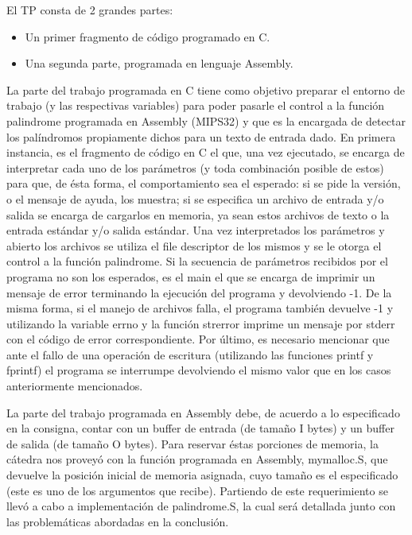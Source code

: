 \documentclass[a4paper,10pt]{article}
\begin{document}
{ \setlength{\parindent}{12pt}

El TP consta de 2 grandes partes:
\begin{itemize}
\item Un primer fragmento de código programado en C.
\item Una segunda parte, programada en lenguaje Assembly.
\end{itemize}

La parte del trabajo programada en C tiene como objetivo preparar el entorno de trabajo (y las respectivas variables) para poder pasarle el control a la función palindrome programada en Assembly (MIPS32) y que es la encargada de detectar los palíndromos propiamente dichos para un texto de entrada dado. En primera instancia, es el fragmento de código en C el que, una vez ejecutado, se encarga de interpretar cada uno de los parámetros (y toda combinación posible de estos) para que, de ésta forma, el comportamiento sea el esperado: si se pide la versión, o el mensaje de ayuda, los muestra; si se especifica un archivo de entrada y/o salida se encarga de cargarlos en memoria, ya sean estos archivos de texto o la entrada estándar y/o salida estándar. Una vez interpretados los parámetros y abierto los archivos se utiliza el file descriptor
de los mismos y se le otorga el control a la función palindrome. Si la secuencia de parámetros recibidos
por el programa no son los esperados, es el main el que se encarga de imprimir
un mensaje de error terminando la ejecución del programa y devolviendo -1. De la misma forma, si el manejo de archivos falla, el programa también devuelve -1 y utilizando la variable errno y la función strerror imprime un mensaje por stderr con el código de error correspondiente. Por último, es necesario mencionar que ante el fallo de una operación de escritura (utilizando las funciones printf y fprintf) el programa se interrumpe devolviendo el mismo valor que en los casos anteriormente mencionados. 

\indent 
La parte del trabajo programada en Assembly debe, de acuerdo a lo especificado en la consigna, contar con un buffer de entrada (de tamaño I bytes) y un buffer de salida (de tamaño O bytes). Para reservar éstas porciones de memoria, la cátedra nos proveyó con la función programada en Assembly, mymalloc.S, que devuelve la posición inicial de memoria asignada, cuyo tamaño es el especificado (este es uno de los argumentos que recibe). Partiendo de este requerimiento se llevó a cabo a implementación de palindrome.S, la cual será detallada junto con las problemáticas abordadas en la conclusión.
	
}
\end{document}
